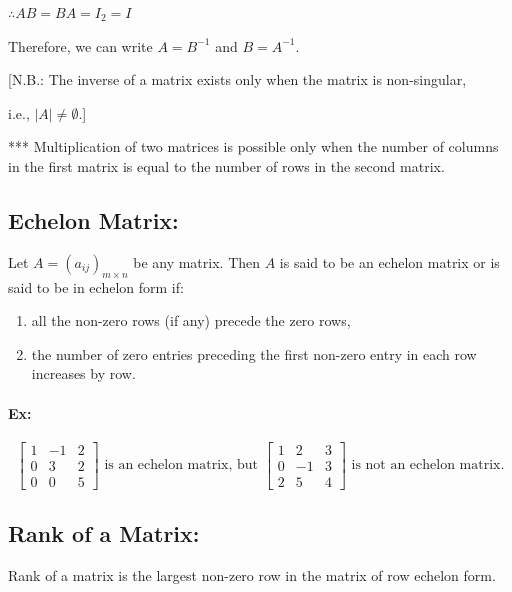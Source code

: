 \documentclass{article}
\begin{document}
    \vspace{10pt}
    
    \(\therefore\)\(AB = BA = I_{2} = I\)
    
    Therefore, we can write \( A = B^{-1} \) and \( B = A^{-1} \).

    \vspace{30pt}
    [N.B.: The inverse of a matrix exists only when the matrix is non-singular,

i.e., \( |A| \neq \emptyset \).]

    *** Multiplication of two matrices is possible only when the number of columns in the first matrix is equal to the number of rows in the second matrix.

\vspace{20pt}

\subsection*{Echelon Matrix:}
    \vspace{10pt}
    Let \( A = (a_{ij})_{m \times n} \) be any matrix. Then \( A \) is said to be an echelon matrix or is said to be in echelon form if:
    \begin{enumerate}
        \item all the non-zero rows (if any) precede the zero rows,
        \item the number of zero entries preceding the first non-zero entry in each row increases by row.
    \end{enumerate}

    \vspace{10pt}

    \paragraph{Ex:}
    \[\begin{bmatrix} 1 & -1 & 2 \\ 0 & 3 & 2 \\ 0 & 0 & 5 \end{bmatrix} \text{ is an echelon matrix,  but } \begin{bmatrix} 1 & 2 & 3 \\ 0 & -1 & 3 \\ 2 & 5 & 4 \end{bmatrix} \text{ is not an echelon matrix.}\]

    \vspace{20px}

\subsection*{Rank of a Matrix:}
    \vspace{10pt}
    Rank of a matrix is the largest non-zero row in the matrix of row echelon form.
\end{document}
